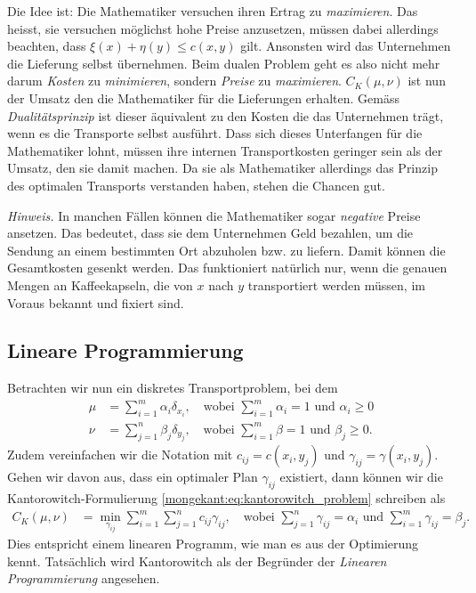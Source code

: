 Die Idee ist:
Die Mathematiker versuchen ihren Ertrag zu \emph{maximieren}.
Das heisst,
sie versuchen möglichst hohe Preise anzusetzen,
müssen dabei allerdings beachten,
dass $\xi(x)+\eta(y) \leq c(x,y)$ gilt.
Ansonsten wird das Unternehmen die Lieferung selbst übernehmen.
Beim dualen Problem geht es also nicht mehr darum \emph{Kosten} zu \emph{minimieren},
sondern \emph{Preise} zu \emph{maximieren}.
$C_K(\mu,\nu)$ ist nun der Umsatz den die Mathematiker für die Lieferungen erhalten.
Gemäss \emph{Dualitätsprinzip} ist dieser äquivalent zu den Kosten die das Unternehmen trägt,
wenn es die Transporte selbst ausführt.
Dass sich dieses Unterfangen für die Mathematiker lohnt,
müssen ihre internen Transportkosten geringer sein als der Umsatz,
den sie damit machen.
Da sie als Mathematiker allerdings das Prinzip des optimalen Transports verstanden haben,
stehen die Chancen gut.

\emph{Hinweis.}
In manchen Fällen können die Mathematiker sogar \emph{negative} Preise ansetzen.
Das bedeutet,
dass sie dem Unternehmen Geld bezahlen,
um die Sendung an einem bestimmten Ort abzuholen bzw. zu liefern.
Damit können die Gesamtkosten gesenkt werden.
Das funktioniert natürlich nur,
wenn die genauen Mengen an Kaffeekapseln,
die von $x$ nach $y$ transportiert werden müssen,
im Voraus bekannt und fixiert sind.

\subsection{Lineare Programmierung%
\label{mongekant:subsection:linear_programming}}

Betrachten wir nun ein diskretes Transportproblem,
bei dem
\begin{align*}
\mu
&=
\sum_{i=1}^m \alpha_i \delta_{x_i}
,\quad\text{wobei }
\sum_{i=1}^m \alpha_i = 1
\text{ und }
\alpha_i \geq 0
\\
\nu
&=
\sum_{j=1}^n \beta_j \delta_{y_j}
,\quad\text{wobei }
\sum_{i=1}^m \beta = 1
\text{ und }
\beta_j \geq 0
.
\end{align*}
Zudem vereinfachen wir die Notation mit $c_{ij} = c(x_i, y_j)$ und
$\gamma_{ij} = \gamma(x_i, y_j)$.
Gehen wir davon aus,
dass ein optimaler Plan $\gamma_{ij}$ existiert,
dann können wir die Kantorowitch-Formulierung \eqref{mongekant:eq:kantorowitch_problem} schreiben als
\begin{align*}
C_K(\mu, \nu)
&=
\min_{\gamma_{ij}}
\sum_{i=1}^m \sum_{j=1}^n c_{ij} \gamma_{ij}
,\quad
\text{wobei }
\sum_{j=1}^n \gamma_{ij} = \alpha_i
\text{ und }
\sum_{i=1}^m \gamma_{ij} = \beta_j
.
\end{align*}
Dies entspricht einem linearen Programm,
wie man es aus der Optimierung kennt.
Tatsächlich wird Kantorowitch als der Begründer der \emph{Linearen Programmierung} angesehen.
